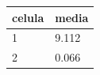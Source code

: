 \begin{tabular}{ll}
\toprule
celula & media \\
\midrule
1 & 9.112 \\
2 & 0.066 \\
\bottomrule
\end{tabular}
